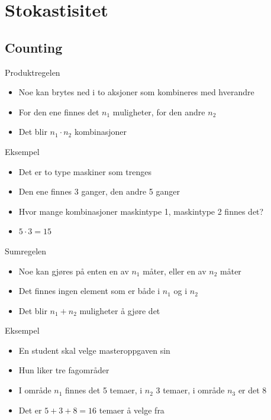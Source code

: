\section{Stokastisitet}
\subsection{Counting}
\begin{frame}
\begin{block}{Produktregelen}
\begin{itemize}
\item Noe kan brytes ned i to aksjoner som kombineres med hverandre
\item For den ene finnes det $n_1$ muligheter, for den andre $n_2$
\item Det blir $n_1\cdot n_2$ kombinasjoner
\end{itemize}
\end{block}
\pause
\begin{block}{Eksempel}
\begin{itemize}
\item Det er to type maskiner som trenges
\item Den ene finnes 3 ganger, den andre 5 ganger
\item Hvor mange kombinasjoner maskintype 1, maskintype 2 finnes det?
\item $5\cdot 3=15$
\end{itemize}
\end{block}
\end{frame}

\begin{frame}
\begin{block}{Sumregelen}
\begin{itemize}
\item Noe kan gjøres på enten en av $n_1$ måter, eller en av $n_2$ måter
\item Det finnes ingen element som er både i $n_1$ og i $n_2$
\item Det blir $n_1+n_2$ muligheter å gjøre det
\end{itemize}
\end{block}
\pause
\begin{block}{Eksempel}
\begin{itemize}
\item En student skal velge masteroppgaven sin
\item Hun liker tre fagområder
\item I område $n_1$ finnes det 5 temaer, i $n_2$ 3 temaer, i område $n_3$ er det 8
\item Det er $5+3+8=16$ temaer å velge fra
\end{itemize}
\end{block}
\end{frame}

